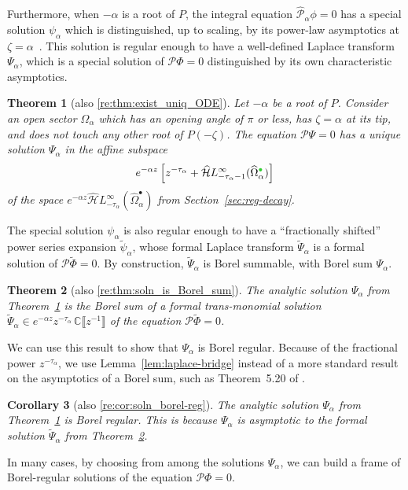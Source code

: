 \documentclass{article}
\newcommand{\dualsingexp}[1]{\widehat{\mathcal{H}}L^\infty_{#1}}
\newcommand{\C}{\mathbb{C}}
\newcommand{\series}[1]{\tilde{#1}}
\theoremstyle{definition}
\theoremstyle{plain}
\newtheorem{theorem}{Theorem}[section]
\newtheorem{corollary}[theorem]{Corollary}
\begin{document}
Furthermore, when $-\alpha$ is a root of $P$, the integral equation $\hat{\mathcal{P}}_\alpha \phi = 0$ has a special solution $\psi_\alpha$ which is distinguished, up to scaling, by its power-law asymptotics at $\zeta = \alpha$~\cite[Theorem~4]{reg-sing-volterra}. This solution is regular enough to have a well-defined Laplace transform $\Psi_\alpha$, which is a special solution of $\mathcal{P}\Phi = 0$ distinguished by its own characteristic asymptotics.
\begin{theorem}[also \ref{re:thm:exist_uniq_ODE}]\label{thm:exist_uniq_ODE}
Let $-\alpha$ be a root of $P$. Consider an open sector $\Omega_\alpha$ which has an opening angle of $\pi$ or less, has $\zeta = \alpha$ at its tip, and does not touch any other root of $P(-\zeta)$. The equation $\mathcal{P}\Psi = 0$ has a unique solution $\Psi_\alpha$ in the affine subspace
\[ e^{-\alpha z} \left[ z^{-\tau_\alpha} + \dualsingexp{-\tau_\alpha-1}(\widehat{\Omega}_\alpha^{\textcolor{LimeGreen}{\bullet}}) \right] \]
of the space $e^{-\alpha z} \dualsingexp{-\tau_\alpha}(\widehat{\Omega}_\alpha^\bullet)$ from Section~\ref{sec:reg-decay}.
\end{theorem}
The special solution $\psi_\alpha$ is also regular enough to have a ``fractionally shifted'' power series expansion $\series{\psi}_\alpha$, whose formal Laplace transform $\series{\Psi}_\alpha$ is a formal solution of $\mathcal{P}\series{\Phi} = 0$. By construction, $\series{\Psi}_\alpha$ is Borel summable, with Borel sum $\Psi_\alpha$.
\begin{theorem}[also \ref{re:thm:soln_is_Borel_sum}]\label{thm:soln_is_Borel_sum}
The analytic solution $\Psi_\alpha$ from Theorem~\ref{thm:exist_uniq_ODE} is the Borel sum of a formal trans-monomial solution $\series{\Psi}_\alpha \in e^{-\alpha z} z^{-\tau_\alpha}\,\C \llbracket z^{-1} \rrbracket$ of the equation $\mathcal{P}\series{\Phi} = 0$.
\end{theorem}
We can use this result to show that $\Psi_\alpha$ is Borel regular. Because of the fractional power $z^{-\tau_\alpha}$, we use Lemma~\ref{lem:laplace-bridge} instead of a more standard result on the asymptotics of a Borel sum, such as Theorem~5.20 of \cite{diverg-resurg-i}.
\begin{corollary}[also \ref{re:cor:soln_borel-reg}]\label{cor:soln_borel-reg}
The analytic solution $\Psi_\alpha$ from Theorem~\ref{thm:exist_uniq_ODE} is Borel regular. This is because $\Psi_\alpha$ is asymptotic to the formal solution $\series{\Psi}_\alpha$ from Theorem~\ref{thm:soln_is_Borel_sum}.
\end{corollary}
In many cases, by choosing from among the solutions $\Psi_\alpha$, we can build a frame of Borel-regular solutions of the equation $\mathcal{P}\Phi = 0$.
\end{document}

